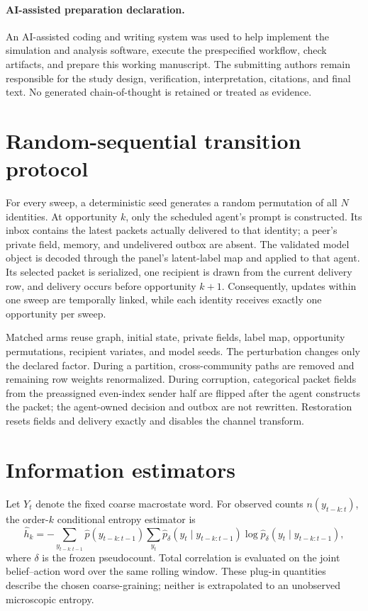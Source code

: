 \documentclass[12pt]{article}
\begin{document}
\paragraph{AI-assisted preparation declaration.}
An AI-assisted coding and writing system was used to help implement the
simulation and analysis software, execute the prespecified workflow, check
artifacts, and prepare this working manuscript. The submitting authors remain
responsible for the study design, verification, interpretation, citations, and
final text. No generated chain-of-thought is retained or treated as evidence.

\appendix
\section{Random-sequential transition protocol}

For every sweep, a deterministic seed generates a random permutation of all
$N$ identities. At opportunity $k$, only the scheduled agent's prompt is
constructed. Its inbox contains the latest packets actually delivered to that
identity; a peer's private field, memory, and undelivered outbox are absent.
The validated model object is decoded through the panel's latent-label map and
applied to that agent. Its selected packet is serialized, one recipient is
drawn from the current delivery row, and delivery occurs before opportunity
$k+1$. Consequently, updates within one sweep are temporally linked, while
each identity receives exactly one opportunity per sweep.

Matched arms reuse graph, initial state, private fields, label map, opportunity
permutations, recipient variates, and model seeds. The perturbation changes
only the declared factor. During a partition, cross-community paths are
removed and remaining row weights renormalized. During corruption, categorical
packet fields from the preassigned even-index sender half are flipped after
the agent constructs the packet; the agent-owned decision and outbox are not
rewritten. Restoration resets fields and delivery exactly and disables the
channel transform.

\section{Information estimators}

Let $Y_t$ denote the fixed coarse macrostate word. For observed counts
$n(y_{t-k:t})$, the order-$k$ conditional entropy estimator is
\begin{equation}
\widehat h_k=-\sum_{y_{t-k:t-1}}\widehat p(y_{t-k:t-1})
\sum_{y_t}\widehat p_{\delta}(y_t\mid y_{t-k:t-1})
\log \widehat p_{\delta}(y_t\mid y_{t-k:t-1}),
\end{equation}
where $\delta$ is the frozen pseudocount. Total correlation is evaluated on
the joint belief--action word over the same rolling window. These plug-in
quantities describe the chosen coarse-graining; neither is extrapolated to an
unobserved microscopic entropy.
\end{document}
